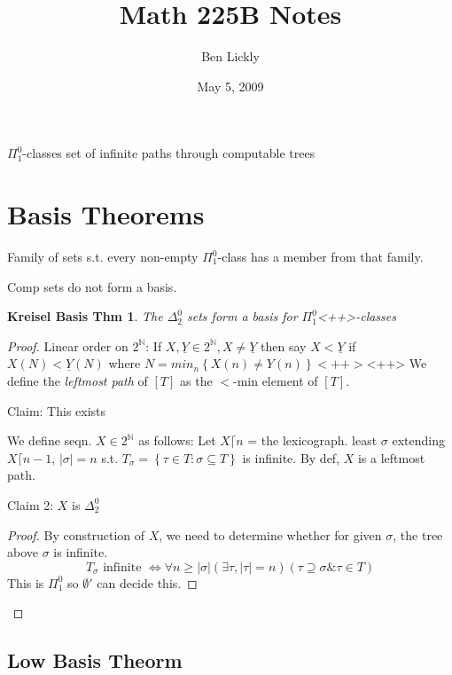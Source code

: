 \documentclass[12pt]{article}
\author{Ben Lickly}
\date{May 5, 2009}
\title{Math 225B Notes}
\newcommand{\Nat}{\ensuremath{\mathbb{N}}}
\begin{document}
\maketitle
$\Pi^0_1$-classes
set of infinite paths through computable trees

\section{Basis Theorems}
Family of sets s.t. every non-empty $\Pi^0_1$-class has a member from that
family.

Comp sets do not form a basis.

\newtheorem*{krb}{Kreisel Basis Thm}
\begin{krb}
  The $\Delta^0_2$ sets form a basis for $\Pi^0_1$<++>-classes
\end{krb}
\begin{proof}
  Linear order on $2^\Nat$:
  If $X,\underline{Y} \in 2^\Nat, X\ne \underline{Y}$ then say
  $X < \underline{Y}$ if $X(N) < \underline{Y}(N)$
  where $N = min_n\left\{ X(n) \ne Y(n) \right\}<++>$<++>
  We define the \emph{leftmost path} of $[T]$ as the $<$-min element of $[T]$.

  Claim: This exists

  We define seqn. $X \in 2^\Nat$ as follows:
  Let $X \lceil n$ = the lexicograph. least $\sigma$
  extending $X \lceil n-1$, $|\sigma| = n$
  s.t. $T_\sigma = \left\{  \tau \in T : \sigma \subseteq T \right\}$
  is infinite.
  By def, $X$ is a leftmost path.

  Claim 2: $X$ is $\Delta^0_2$
  \begin{proof}
    By construction of $X$, we need to determine whether for given $\sigma$,
    the tree above $\sigma$ is infinite.
\[
T_\sigma \text{ infinite } \Leftrightarrow \forall n \ge |\sigma|
        (\exists \tau, |\tau| = n) (\tau \supseteq \sigma \& \tau \in T)
\]
    This is $\Pi^0_1$ so $\emptyset'$ can decide this.
  \end{proof}
\end{proof}

\subsection{Low Basis Theorm}
\end{document}
